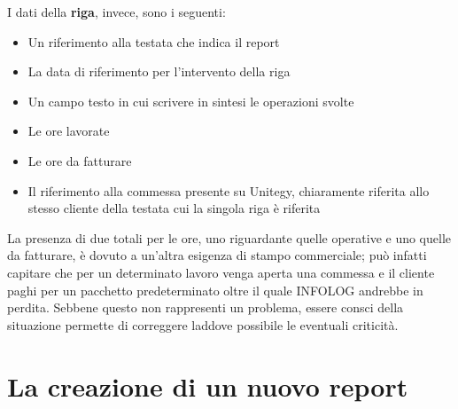 I dati della \textbf{riga}, invece, sono i seguenti:
\begin{itemize}
    \item Un riferimento alla testata che indica il report
    \item La data di riferimento per l'intervento della riga
    \item Un campo testo in cui scrivere in sintesi le operazioni svolte
    \item Le ore lavorate
    \item Le ore da fatturare
    \item Il riferimento alla commessa presente su Unitegy, chiaramente riferita allo stesso cliente della testata cui la singola riga è riferita
\end{itemize}
La presenza di due totali per le ore, uno riguardante quelle operative e uno quelle da fatturare, è dovuto a un'altra esigenza di stampo commerciale; può infatti capitare che per
un determinato lavoro venga aperta una commessa e il cliente paghi per un pacchetto predeterminato oltre il quale INFOLOG andrebbe in perdita. Sebbene questo non rappresenti un
problema, essere consci della situazione permette di correggere laddove possibile le eventuali criticità.

\section{La creazione di un nuovo report}

